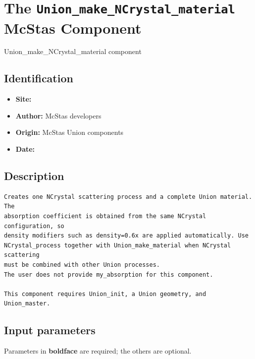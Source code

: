 \section{The \texttt{Union\_make\_NCrystal\_material} McStas Component}
Union\_make\_NCrystal\_material component

\subsection*{Identification}
\begin{itemize}
  \item \textbf{Site:}
  \item \textbf{Author:} McStas developers
  \item \textbf{Origin:} McStas Union components
  \item \textbf{Date:}
\end{itemize}

\subsection*{Description}
\begin{lstlisting}
Creates one NCrystal scattering process and a complete Union material. The
absorption coefficient is obtained from the same NCrystal configuration, so
density modifiers such as density=0.6x are applied automatically. Use
NCrystal_process together with Union_make_material when NCrystal scattering
must be combined with other Union processes.
The user does not provide my_absorption for this component.

This component requires Union_init, a Union geometry, and Union_master.
\end{lstlisting}

\subsection*{Input parameters}
Parameters in \textbf{boldface} are required; the others are optional.


